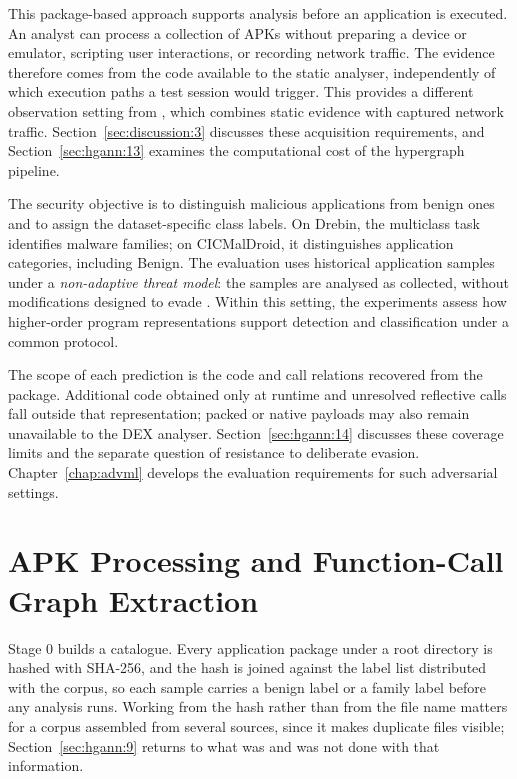 This package-based approach supports analysis before an application is executed. An analyst can
process a collection of APKs without preparing a device or emulator, scripting user interactions,
or recording network traffic. The evidence therefore comes from the code available to the static
analyser, independently of which execution paths a test session would trigger. This provides a
different observation setting from \hybroid{}, which combines static evidence with captured
network traffic. Section~\ref{sec:discussion:3} discusses these acquisition requirements, and
Section~\ref{sec:hgann:13} examines the computational cost of the hypergraph pipeline.

The security objective is to distinguish malicious applications from benign ones and to assign
the dataset-specific class labels. On Drebin, the multiclass task identifies malware families;
on CICMalDroid, it distinguishes application categories, including Benign. The evaluation uses
historical application samples under a \emph{non-adaptive threat model}: the samples are analysed
as collected, without modifications designed to evade \hgann{}. Within this setting, the
experiments assess how higher-order program representations support detection and classification
under a common protocol.

The scope of each prediction is the code and call relations recovered from the package.
Additional code obtained only at runtime and unresolved reflective calls fall outside that
representation; packed or native payloads may also remain unavailable to the DEX analyser.
Section~\ref{sec:hgann:14} discusses these coverage limits and the separate question of resistance
to deliberate evasion. Chapter~\ref{chap:advml} develops the evaluation requirements for such
adversarial settings.

\section{APK Processing and Function-Call Graph Extraction}
\label{sec:hgann:4}

Stage 0 builds a catalogue. Every application package under a root directory is hashed
with SHA-256, and the hash is joined against the label list distributed with the corpus, so each
sample carries a benign label or a family label before any analysis runs. Working from the hash
rather than from the file name matters for a corpus assembled from several sources, since it makes
duplicate files visible; Section~\ref{sec:hgann:9} returns to what was and was not done with that
information.

